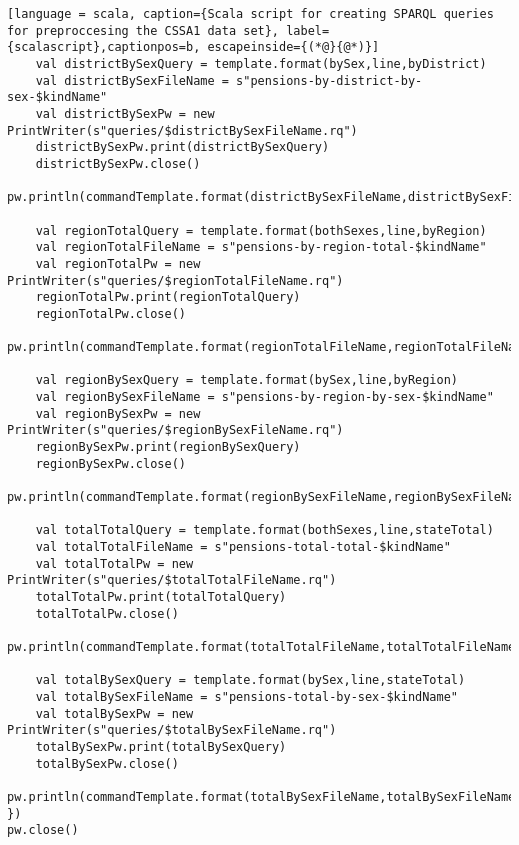 \begin{lstlisting}[language = scala, caption={Scala script for creating SPARQL queries for preproccesing the CSSA1 data set}, label={scalascript},captionpos=b, escapeinside={(*@}{@*)}]
    val districtBySexQuery = template.format(bySex,line,byDistrict)
    val districtBySexFileName = s"pensions-by-district-by-sex-$kindName"
    val districtBySexPw = new PrintWriter(s"queries/$districtBySexFileName.rq")
    districtBySexPw.print(districtBySexQuery)
    districtBySexPw.close()
    pw.println(commandTemplate.format(districtBySexFileName,districtBySexFileName))
    
    val regionTotalQuery = template.format(bothSexes,line,byRegion)
    val regionTotalFileName = s"pensions-by-region-total-$kindName"
    val regionTotalPw = new PrintWriter(s"queries/$regionTotalFileName.rq")
    regionTotalPw.print(regionTotalQuery)
    regionTotalPw.close()
    pw.println(commandTemplate.format(regionTotalFileName,regionTotalFileName))
    
    val regionBySexQuery = template.format(bySex,line,byRegion)
    val regionBySexFileName = s"pensions-by-region-by-sex-$kindName"
    val regionBySexPw = new PrintWriter(s"queries/$regionBySexFileName.rq")
    regionBySexPw.print(regionBySexQuery)
    regionBySexPw.close()
    pw.println(commandTemplate.format(regionBySexFileName,regionBySexFileName))
    
    val totalTotalQuery = template.format(bothSexes,line,stateTotal)
    val totalTotalFileName = s"pensions-total-total-$kindName"
    val totalTotalPw = new PrintWriter(s"queries/$totalTotalFileName.rq")
    totalTotalPw.print(totalTotalQuery)
    totalTotalPw.close()
    pw.println(commandTemplate.format(totalTotalFileName,totalTotalFileName))
    
    val totalBySexQuery = template.format(bySex,line,stateTotal)
    val totalBySexFileName = s"pensions-total-by-sex-$kindName"
    val totalBySexPw = new PrintWriter(s"queries/$totalBySexFileName.rq")
    totalBySexPw.print(totalBySexQuery)
    totalBySexPw.close()
    pw.println(commandTemplate.format(totalBySexFileName,totalBySexFileName))
})
pw.close()
\end{lstlisting}



